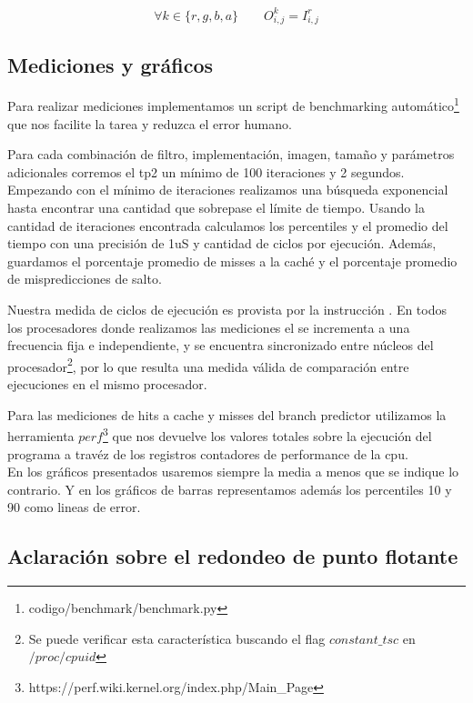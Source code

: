 $$\forall k \in \{r,g,b,a\} \qquad O^k_{i,j} = I^r_{i,j}$$

\subsection{Mediciones y gráficos}

Para realizar mediciones implementamos un script de benchmarking automático\footnote{codigo/benchmark/benchmark.py} que nos facilite la tarea y reduzca el error humano.

Para cada combinación de filtro, implementación, imagen, tamaño y parámetros adicionales corremos el tp2 un mínimo de 100 iteraciones y 2 segundos. Empezando con el mínimo de iteraciones realizamos una búsqueda exponencial hasta encontrar una cantidad que sobrepase el límite de tiempo. Usando la cantidad de iteraciones encontrada calculamos los percentiles y el promedio del tiempo con una precisión de 1uS y cantidad de ciclos por ejecución. Además, guardamos el porcentaje promedio de misses a la caché y el porcentaje promedio de mispredicciones de salto.

Nuestra medida de ciclos de ejecución es provista por la instrucción . En todos los procesadores donde realizamos las mediciones el  se incrementa a una frecuencia fija e independiente, y se encuentra sincronizado entre núcleos del procesador\footnote{Se puede verificar esta característica buscando el flag $constant\_tsc$ en $/proc/cpuid$}\textsuperscript{\cite[Volume 3B, Chapter 17.15]{intelsys}}, por lo que resulta una medida válida de comparación entre ejecuciones en el mismo procesador.

Para las mediciones de hits a cache y misses del branch predictor utilizamos la herramienta $perf$\footnote{https://perf.wiki.kernel.org/index.php/Main_Page} que nos devuelve los valores totales sobre la ejecución del programa a travéz de los registros contadores de performance de la cpu.
\\

En los gráficos presentados usaremos siempre la media a menos que se indique lo contrario. Y en los gráficos de barras representamos además los percentiles 10 y 90 como lineas de error.
\\

\subsection{Aclaración sobre el redondeo de punto flotante}

